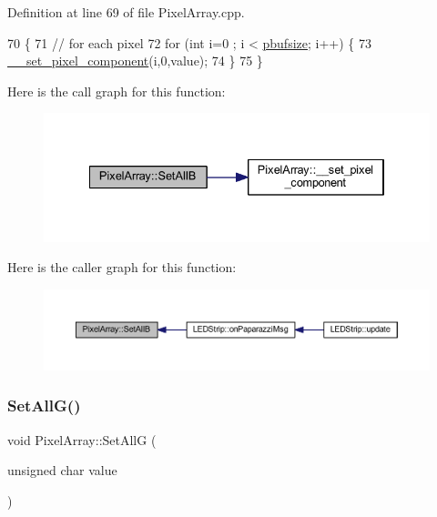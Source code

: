 Definition at line 69 of file Pixel\+Array.\+cpp.


\begin{DoxyCode}
70 \{
71     \textcolor{comment}{// for each pixel}
72     \textcolor{keywordflow}{for} (\textcolor{keywordtype}{int} i=0 ; i < \hyperlink{class_pixel_array_aca29e70f9b643bff3733ab2e694439a1}{pbufsize}; i++) \{
73         \hyperlink{class_pixel_array_a42c6681bf771332826ecc9ad2a8cea02}{\_\_set\_pixel\_component}(i,0,value);
74     \}
75 \}
\end{DoxyCode}
Here is the call graph for this function\+:\nopagebreak
\begin{figure}[H]
\begin{center}
\leavevmode
\includegraphics[width=334pt]{class_pixel_array_a3b17271fdc21503236ca6ca8e37d501b_cgraph}
\end{center}
\end{figure}
Here is the caller graph for this function\+:\nopagebreak
\begin{figure}[H]
\begin{center}
\leavevmode
\includegraphics[width=350pt]{class_pixel_array_a3b17271fdc21503236ca6ca8e37d501b_icgraph}
\end{center}
\end{figure}
\mbox{\label{class_pixel_array_a88f25ee1b266e2dc0ef7ae90ff4bd12d}} 
\subsubsection{\texorpdfstring{Set\+All\+G()}{SetAllG()}}
{\footnotesize\ttfamily void Pixel\+Array\+::\+Set\+AllG (\begin{DoxyParamCaption}\item[{unsigned char}]{value }\end{DoxyParamCaption})}



